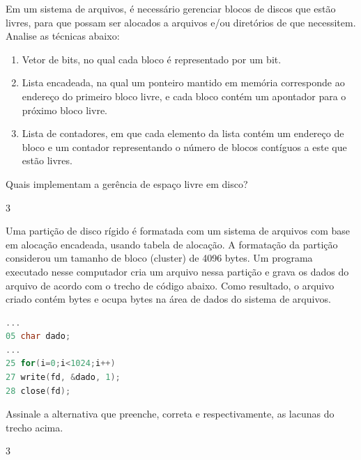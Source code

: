 %
{
\def\AMCbeginQuestion#1#2{\par\noindent{\bf (POSCOMP 2019 - Questão 29)}}
\begin{question}{} Em um sistema de arquivos, é necessário gerenciar blocos de discos que estão livres, para que possam ser alocados a arquivos e/ou diretórios de que necessitem. Analise as técnicas abaixo:
	
\begin{enumerate}[label=\Roman*.]
\item Vetor de bits, no qual cada bloco é representado por um bit.
\item Lista encadeada, na qual um ponteiro mantido em memória corresponde ao endereço do primeiro
bloco livre, e cada bloco contém um apontador para o próximo bloco livre.
\item Lista de contadores, em que cada elemento da lista contém um endereço de bloco e um contador
representando o número de blocos contíguos a este que estão livres.
\end{enumerate}

Quais implementam a gerência de espaço livre em disco?
\begin{multicols}{3}\columnseprule=0.1pt
\begin{choices}
\end{choices}
\end{multicols}
\end{question}
}
%
%
%
{
\def\AMCbeginQuestion#1#2{\par\noindent{\bf (POSCOMP 2019 – Questão 50)}}
\begin{question}{}  Uma partição de disco rígido é formatada com um sistema de arquivos com base em
alocação encadeada, usando tabela de alocação. A formatação da partição considerou um tamanho
de bloco (cluster) de 4096 bytes. Um programa executado nesse computador cria um arquivo nessa
partição e grava os dados do arquivo de acordo com o trecho de código abaixo. Como resultado, o
arquivo criado contém \underline{\hspace{1cm}} bytes e ocupa \underline{\hspace{1cm}} bytes na área de dados do sistema de arquivos.
\begin{lstlisting}[language=C]
...
05 char dado;
...
25 for(i=0;i<1024;i++)
27 write(fd, &dado, 1);
28 close(fd);
\end{lstlisting}

Assinale a alternativa que preenche, correta e respectivamente, as lacunas do trecho acima.
\begin{multicols}{3}\columnseprule=0.1pt
\begin{choices}
\end{choices}
\end{multicols}
\end{question}
}
